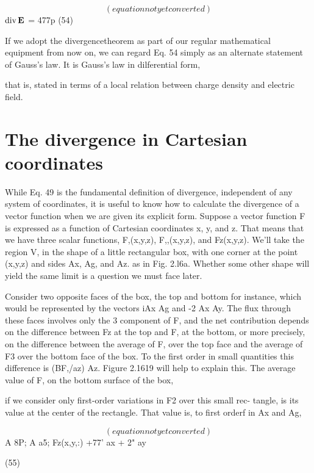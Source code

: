\begin{equation}
(equation not yet converted)
\end{equation}
$\operatorname{div}\mathbf{E}$ = 477p (54)

If we adopt the divergencetheorem as part of our regular mathematical
equipment from now on, we can regard Eq. 54 simply as an alternate
statement of Gauss's law. It is Gauss's law in dilferential form,

that is, stated in terms of a local relation between charge density and
electric field.

\section{The divergence in Cartesian coordinates}

While Eq. 49 is the fundamental definition of divergence, independent
of any system of coordinates, it is useful to know how to
calculate the divergence of a vector function when we are given its
explicit form. Suppose a vector function F is expressed as a function
of Cartesian coordinates x, y, and z. That means that we have three
scalar functions, F,(x,y,z), F,,(x,y,z), and Fz(x,y,z). We'll take the
region V, in the shape of a little rectangular box, with one corner at
the point (x,y,z) and sides Ax, Ag, and Az. as in Fig. 2.l6a. Whether
some other shape will yield the same limit is a question we must face
later.

Consider two opposite faces of the box, the top and bottom for
instance, which would be represented by the vectors iAx Ag and
-2 Ax Ay. The flux through these faces involves only the 3 component
of F, and the net contribution depends on the difference between
Fz at the top and F, at the bottom, or more precisely, on the
difference between the average of F, over the top face and the average
of F3 over the bottom face of the box. To the first order in small
quantities this difference is (BF,/az) Az. Figure 2.1619 will help to explain
this. The average value of F, on the bottom surface of the box,

if we consider only first-order variations in F2 over this small rec-
tangle, is its value at the center of the rectangle. That value is, to
first orderf in Ax and Ag,

\begin{equation}
(equation not yet converted)
\end{equation}
A 8P; A a5;
Fz(x,y,:) +77' ax + 2" ay

(55)

